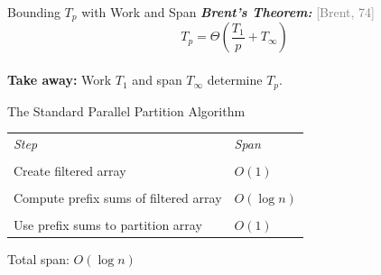 \documentclass[xcolor=x11names, svgnames, rgb]{beamer}
\newcommand{\defn}[1]       {{\textit{\textbf{\boldmath #1}}}}
\newtheorem{defin}{Definition}
\newcommand{\citefont}[1]{{\tiny \textcolor{Gray}{#1}}}
\begin{document}
\begin{frame}[t]{Bounding $T_p$ with Work and Span}
	\defn{Brent's Theorem:} \citefont{[Brent, 74]}
	$$T_p = \Theta\left(\frac{T_1}{p}+T_\infty\right)$$
	$ $\\ \vspace{1cm}
	\textbf{Take away:} Work $T_1$ and span $T_\infty$ determine $T_p$.
\end{frame}


\begin{frame}[t]{The Standard Parallel Partition Algorithm}
\begin{table}[]
\begin{tabular}{ll}
	\emph{Step}                                              & \emph{Span} \\\\
Create filtered array                             & $O(1)$            \\\\
Compute prefix sums of filtered array & $O(\log n)$       \\\\
Use prefix sums to partition array                & $O(1)$           
\end{tabular}
\end{table}
\vspace{10 mm}
Total span: $O(\log n)$
\end{frame}
\end{document}
